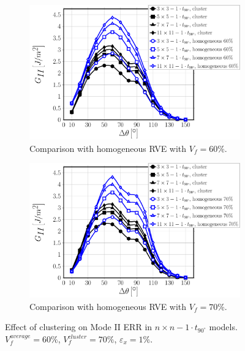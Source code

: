 \documentclass[review]{elsarticle}
\begin{document}
\begin{figure}[!h]
\centering
    \begin{subfigure}[b]{0.475\textwidth}
        \includegraphics[width=\textwidth]{nxn-1t90-vf60-GII.pdf}
        \caption{Comparison with homogeneous RVE with $V_{f}=60\%$.}\label{subfig:cluster1t90nxnModeII60}
    \end{subfigure}\quad
    \begin{subfigure}[b]{0.475\textwidth}
        \includegraphics[width=\textwidth]{nxn-1t90-vf70-GII.pdf}
        \caption{Comparison with homogeneous RVE with $V_{f}=70\%$.}\label{subfig:cluster1t90nxnModeII70}
    \end{subfigure}

\caption{Effect of clustering on Mode II ERR in $n\times n-1\cdot t_{90^{\circ}}$ models. $V^{average}_{f}=60\%$, $V^{cluster}_{f}=70\%$, $\varepsilon_{x}=1\%$.}\label{fig:cluster1t90nxnModeII}
\end{figure}
\end{document}
